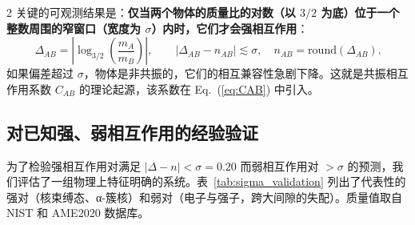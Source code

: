\documentclass[11pt,a4paper]{article}
\begin{document}
\begin{multicols}{2}
		关键的可观测结果是：\textbf{仅当两个物体的质量比的对数（以 \(3/2\) 为底）位于一个整数周围的窄窗口（宽度为 $\sigma$）内时，它们才会强相互作用}：
		\[
		\Delta_{AB} = \left| \log_{3/2}\left( \frac{m_A}{m_B} \right) \right|,\qquad
		|\Delta_{AB} - n_{AB}| \lesssim \sigma,\quad n_{AB} = \text{round}(\Delta_{AB}).
		\]
		如果偏差超过 $\sigma$，物体是非共振的，它们的相互兼容性急剧下降。这就是共振相互作用系数 \(C_{AB}\) 的理论起源，该系数在 Eq.~(\ref{eq:CAB}) 中引入。
		
		\subsection{对已知强、弱相互作用的经验验证}
		
		为了检验强相互作用对满足 \(|\Delta - n| < \sigma = 0.20\) 而弱相互作用对 \(> \sigma\) 的预测，我们评估了一组物理上特征明确的系统。表~\ref{tab:sigma_validation} 列出了代表性的强对（核束缚态、α-簇核）和弱对（电子与强子，跨大间隙的失配）。质量值取自 NIST 和 AME2020 数据库。
		

\end{multicols}
\end{document}

